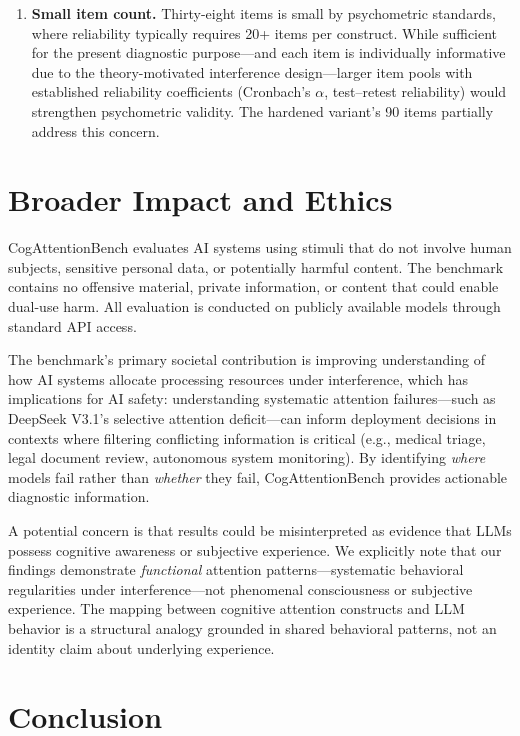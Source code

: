 \documentclass{article}
\begin{document}
\begin{enumerate}
    \item \textbf{Small item count.} Thirty-eight items is small by psychometric standards, where reliability typically requires 20+ items per construct. While sufficient for the present diagnostic purpose---and each item is individually informative due to the theory-motivated interference design---larger item pools with established reliability coefficients (Cronbach's $\alpha$, test--retest reliability) would strengthen psychometric validity. The hardened variant's 90 items partially address this concern.
\end{enumerate}

\section{Broader Impact and Ethics}

CogAttentionBench evaluates AI systems using stimuli that do not involve human subjects, sensitive personal data, or potentially harmful content. The benchmark contains no offensive material, private information, or content that could enable dual-use harm. All evaluation is conducted on publicly available models through standard API access.

The benchmark's primary societal contribution is improving understanding of how AI systems allocate processing resources under interference, which has implications for AI safety: understanding systematic attention failures---such as DeepSeek V3.1's selective attention deficit---can inform deployment decisions in contexts where filtering conflicting information is critical (e.g., medical triage, legal document review, autonomous system monitoring). By identifying \emph{where} models fail rather than \emph{whether} they fail, CogAttentionBench provides actionable diagnostic information.

A potential concern is that results could be misinterpreted as evidence that LLMs possess cognitive awareness or subjective experience. We explicitly note that our findings demonstrate \emph{functional} attention patterns---systematic behavioral regularities under interference---not phenomenal consciousness or subjective experience. The mapping between cognitive attention constructs and LLM behavior is a structural analogy grounded in shared behavioral patterns, not an identity claim about underlying experience.

\section{Conclusion}
\end{document}
